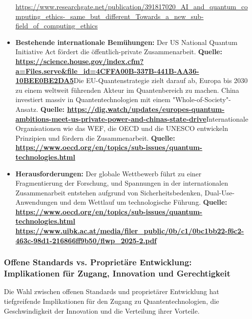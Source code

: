 \begin{itemize}
{\href{https://www.researchgate.net/publication/391817020_AI_and_quantum_computing_ethics-_same_but_different_Towards_a_new_sub-field_of_computing_ethics}{https://www.researchgate.net/publication/391817020\_AI\_and\_quantum\_computing\_ethics-\_same\_but\_different\_Towards\_a\_new\_sub-field\_of\_computing\_ethics}
}
    \item \textbf{Bestehende internationale Bemühungen:} Der US National Quantum Initiative Act fördert die öffentlich-private Zusammenarbeit. \textbf{Quelle: \href{https://science.house.gov/index.cfm?a=Files.serve&file_id=4CFFA00B-337B-441B-AA36-10BEE0BE2DA5}{https://science.house.gov/index.cfm?a=Files.serve\&file\_id=4CFFA00B-337B-441B-AA36-10BEE0BE2DA5}}Die EU-Quantenstrategie zielt darauf ab, Europa bis 2030 zu einem weltweit führenden Akteur im Quantenbereich zu machen. China investiert massiv in Quantentechnologien mit einem "Whole-of-Society"-Ansatz. \textbf{Quelle: \href{https://dig.watch/updates/europes-quantum-ambitions-meet-us-private-power-and-chinas-state-drive}{https://dig.watch/updates/europes-quantum-ambitions-meet-us-private-power-and-chinas-state-drive}}Internationale Organisationen wie das WEF, die OECD und die UNESCO entwickeln Prinzipien und fördern die Zusammenarbeit. \textbf{Quelle: 
\href{https://www.oecd.org/en/topics/sub-issues/quantum-technologies.html}{https://www.oecd.org/en/topics/sub-issues/quantum-technologies.html}
}
\end{itemize}
\begin{itemize}
    \item \textbf{Herausforderungen:} Der globale Wettbewerb führt zu einer Fragmentierung der Forschung, und Spannungen in der internationalen Zusammenarbeit entstehen aufgrund von Sicherheitsbedenken, Dual-Use-Anwendungen und dem Wettlauf um technologische Führung. \textbf{Quelle: 
\href{https://www.oecd.org/en/topics/sub-issues/quantum-technologies.html}{https://www.oecd.org/en/topics/sub-issues/quantum-technologies.html } \href{https://www.uibk.ac.at/media/filer_public/0b/c1/0bc1bb22-f6c2-463c-98d1-216866ff9b50/flwp_2025-2.pdf}{https://www.uibk.ac.at/media/filer\_public/0b/c1/0bc1bb22-f6c2-463c-98d1-216866ff9b50/flwp\_2025-2.pdf}
}
\end{itemize}

\subsubsection{Offene Standards vs. Proprietäre Entwicklung: Implikationen für Zugang, Innovation und Gerechtigkeit}
Die Wahl zwischen offenen Standards und proprietärer Entwicklung hat tiefgreifende Implikationen für den Zugang zu Quantentechnologien, die Geschwindigkeit der Innovation und die Verteilung ihrer Vorteile.

